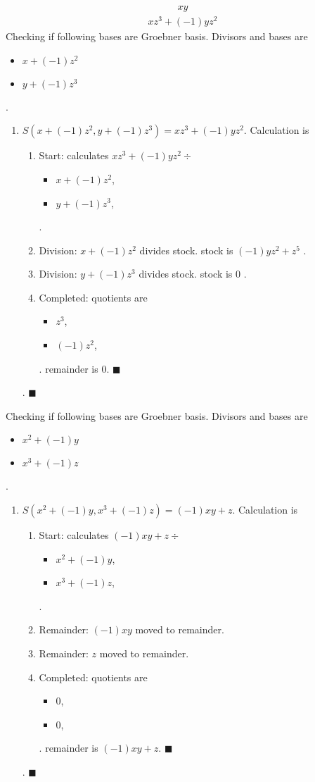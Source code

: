 \documentclass{jsarticle}
\begin{document}
\begin{align}
xy
\end{align}
\begin{align}
xz^{3}+(-1)yz^{2}
\end{align}
Checking if following bases are Groebner basis.  
Divisors and bases are 
\begin{itemize}
\item $x+(-1)z^{2}$\item $y+(-1)z^{3}$\end{itemize} .  
\begin{enumerate}
\item $S(x+(-1)z^{2}, y+(-1)z^{3}) = xz^{3}+(-1)yz^{2}$.  Calculation is \begin{enumerate}
\item Start: calculates $xz^{3}+(-1)yz^{2}\div $\begin{itemize}
\item $x+(-1)z^{2}$, 
\item $y+(-1)z^{3}$, 
\end{itemize} .  

\item Division: $x+(-1)z^{2}$ divides stock. stock is $(-1)yz^{2}+z^{5}$ .  
\item Division: $y+(-1)z^{3}$ divides stock. stock is $0$ .  
\item Completed: quotients are \begin{itemize}
\item $z^{3}$, 
\item $(-1)z^{2}$, 
\end{itemize} .  
remainder is $0$.  $\blacksquare$
\end{enumerate}
.  $\blacksquare{}$\end{enumerate}
Checking if following bases are Groebner basis.  
Divisors and bases are 
\begin{itemize}
\item $x^{2}+(-1)y$\item $x^{3}+(-1)z$\end{itemize} .  
\begin{enumerate}
\item $S(x^{2}+(-1)y, x^{3}+(-1)z) = (-1)xy+z$.  Calculation is \begin{enumerate}
\item Start: calculates $(-1)xy+z\div $\begin{itemize}
\item $x^{2}+(-1)y$, 
\item $x^{3}+(-1)z$, 
\end{itemize} .  

\item Remainder: $(-1)xy$ moved to remainder.  
\item Remainder: $z$ moved to remainder.  
\item Completed: quotients are \begin{itemize}
\item $0$, 
\item $0$, 
\end{itemize} .  
remainder is $(-1)xy+z$.  $\blacksquare$
\end{enumerate}
.  $\blacksquare{}$\end{enumerate}
\end{document}
